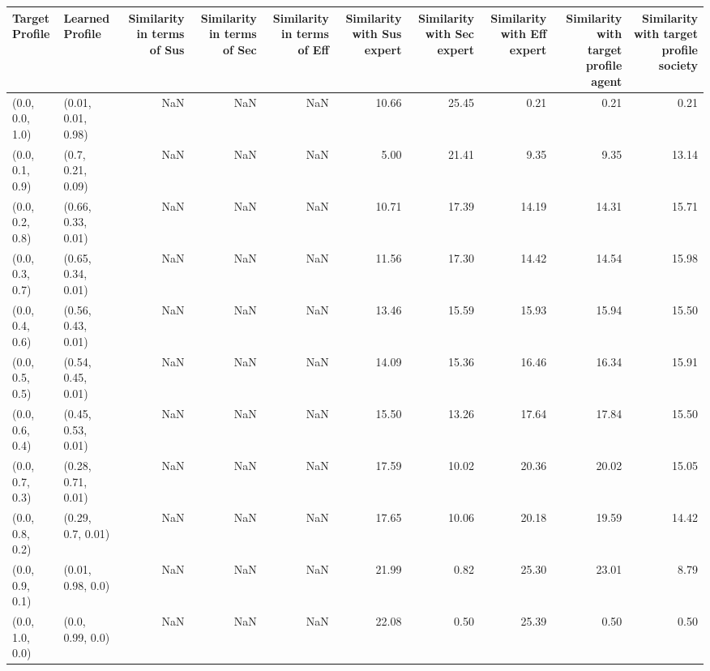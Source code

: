 \begin{tabular}{llrrrrrrrr}
\toprule
Target Profile & Learned Profile & Similarity in terms of Sus & Similarity in terms of Sec & Similarity in terms of Eff & Similarity with Sus expert & Similarity with Sec expert & Similarity with Eff expert & Similarity with target profile agent & Similarity with target profile society \\
\midrule
(0.0, 0.0, 1.0) & (0.01, 0.01, 0.98) & NaN & NaN & NaN & 10.66 & 25.45 & 0.21 & 0.21 & 0.21 \\
(0.0, 0.1, 0.9) & (0.7, 0.21, 0.09) & NaN & NaN & NaN & 5.00 & 21.41 & 9.35 & 9.35 & 13.14 \\
(0.0, 0.2, 0.8) & (0.66, 0.33, 0.01) & NaN & NaN & NaN & 10.71 & 17.39 & 14.19 & 14.31 & 15.71 \\
(0.0, 0.3, 0.7) & (0.65, 0.34, 0.01) & NaN & NaN & NaN & 11.56 & 17.30 & 14.42 & 14.54 & 15.98 \\
(0.0, 0.4, 0.6) & (0.56, 0.43, 0.01) & NaN & NaN & NaN & 13.46 & 15.59 & 15.93 & 15.94 & 15.50 \\
(0.0, 0.5, 0.5) & (0.54, 0.45, 0.01) & NaN & NaN & NaN & 14.09 & 15.36 & 16.46 & 16.34 & 15.91 \\
(0.0, 0.6, 0.4) & (0.45, 0.53, 0.01) & NaN & NaN & NaN & 15.50 & 13.26 & 17.64 & 17.84 & 15.50 \\
(0.0, 0.7, 0.3) & (0.28, 0.71, 0.01) & NaN & NaN & NaN & 17.59 & 10.02 & 20.36 & 20.02 & 15.05 \\
(0.0, 0.8, 0.2) & (0.29, 0.7, 0.01) & NaN & NaN & NaN & 17.65 & 10.06 & 20.18 & 19.59 & 14.42 \\
(0.0, 0.9, 0.1) & (0.01, 0.98, 0.0) & NaN & NaN & NaN & 21.99 & 0.82 & 25.30 & 23.01 & 8.79 \\
(0.0, 1.0, 0.0) & (0.0, 0.99, 0.0) & NaN & NaN & NaN & 22.08 & 0.50 & 25.39 & 0.50 & 0.50 \\
\bottomrule
\end{tabular}
